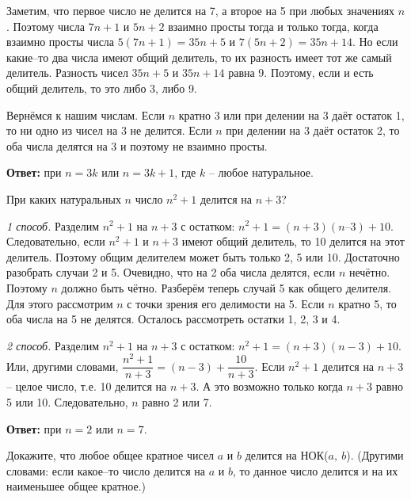 \begin{prf}
    Заметим, что первое число не делится на 7, а второе на 5 при любых значениях $n$. Поэтому числа $7n + 1$ и $5n + 2$ взаимно просты тогда и только тогда, когда взаимно просты числа $5(7n + 1) = 35n + 5$ и $7(5n + 2) = 35n +14$. Но если какие--то два числа имеют общий делитель, то их разность имеет тот же самый делитель. Разность чисел $35n + 5$ и $35n + 14$ равна 9. Поэтому, если и есть общий делитель, то это либо 3, либо 9.
    \par Вернёмся к нашим числам. Если $n$ кратно 3 или при делении на 3 даёт остаток 1, то ни одно из чисел на 3 не делится. Если $n$ при делении на 3 даёт остаток 2, то оба числа делятся на 3 и поэтому не взаимно просты.
    \par \textbf{Ответ:} при $n = 3k$ или $n = 3k + 1$, где $k$ -- любое натуральное.
\end{prf}

\begin{thm}
    При каких натуральных $n$ число $n^2 + 1$ делится на $n + 3$?
\end{thm}

\begin{prf}
    \textit{1 способ.} Разделим $n^2 + 1$ на $n + 3$ с остатком: $n^2 + 1 = (n + 3)(n – 3) + 10$. Следовательно, если $n^2 + 1$ и $n + 3$ имеют общий делитель, то 10 делится на этот делитель. Поэтому общим делителем может быть только 2, 5 или 10. Достаточно разобрать случаи 2 и 5. Очевидно, что на 2 оба числа делятся, если $n$ нечётно. Поэтому $n$ должно быть чётно. Разберём теперь случай 5 как общего делителя. Для этого рассмотрим $n$ с точки зрения его делимости на 5. Если $n$ кратно 5, то оба числа на 5 не делятся. Осталось рассмотреть остатки 1, 2, 3 и 4.
    \par
    \textit{2 способ.} Разделим $n^2 + 1$ на $n + 3$ с остатком: $n^2 + 1 = (n + 3)(n - 3) + 10$. Или, другими словами, $\dfrac{n^2 + 1}{n + 3} = (n - 3) + \dfrac{10}{n + 3}$. Если $n^2 + 1$ делится на $n + 3$ -- целое число, т.е. 10 делится на $n + 3$. А это возможно только когда $n + 3$ равно 5 или 10. Следовательно, $n$ равно 2 или 7.
    \par \textbf{Ответ:} при $n = 2$ или $n = 7$.
\end{prf}

\begin{thm} \label{10.8 thm3}
    Докажите, что любое общее кратное чисел $a$ и $b$ делится на НОК($a,~b$). (Другими словами: если какое--то число делится на $a$ и $b$, то данное число делится и на их наименьшее общее кратное.)
\end{thm}

